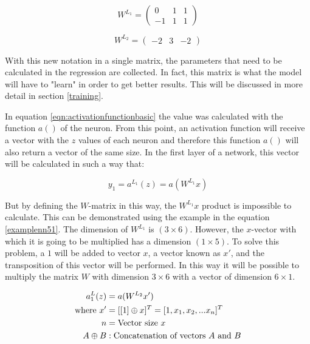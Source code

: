 \begin{equation}
  W^{L_1} = \begin{pmatrix}
  0 & 1 & 1 \\ 
  -1 & 1 & 1
  \end{pmatrix}
\end{equation}

\begin{equation}
  W^{L_2} = \begin{pmatrix}
  -2 & 3 & -2
  \end{pmatrix}
\end{equation}


With this new notation in a single matrix, the parameters that need to be calculated in the regression are collected. In fact, this matrix is what the model will have to "learn" in order to get better results. This will be discussed in more detail in section \ref{training}.
\newline


In equation \ref{eqn:activationfunctionbasic} the value was calculated with the function $a()$ of the neuron. From this point, an activation function will receive a vector with the $z$ values of each neuron and therefore this function $a()$ will also return a vector of the same size. In the first layer of a network, this vector will be calculated in such a way that:

\begin{equation}
  y_1 = a^{L_1}(z) = a(W^{L_1}x)
  \label{eqn:activationmatrixwrong}
\end{equation}


But by defining the $W$-matrix in this way, the $W^{L_1}x$ product is impossible to calculate. This can be demonstrated using the example in the equation \ref{examplenn51}. The dimension of $W^{L_1}$ is $(3 \times 6)$. However, the $x$-vector with which it is going to be multiplied has a dimension $(1 \times 5)$. To solve this problem, a $1$ will be added to vector $x$, a vector known as $x'$, and the transposition of this vector will be performed. In this way it will be possible to multiply the matrix $W$ with dimension $3\times6$ with a vector of dimension $6\times1$.

\begin{equation}
\centering
    \begin{split}
  a^L_1(z) &= a(W^{L_2}x') \\
    \text{where}~x' &= [[1] \oplus x]^T = [1, x_1, x_2, ... x_n]^T \\
    n &= \text{Vector size } x \\
    A \oplus B &: \text{Concatenation of vectors } A \text{ and } B
  \end{split}
  \label{eqn:newactivationsimple}
\end{equation}

